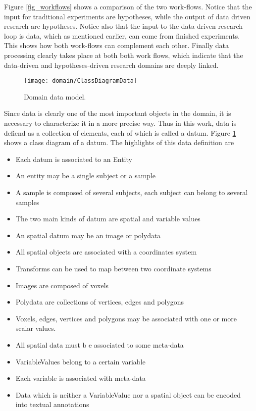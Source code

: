 Figure \ref{fig_workflows} shows a comparison of the two work-flows. Notice that the input for traditional experiments are hypotheses, while the output of data driven research are  hypotheses. Notice also that the input to the data-driven research loop is data, which as mentioned earlier, can come from finished experiments. This shows how both work-flows can complement each other. Finally data processing clearly takes place at both both work flows, which indicate that the data-driven and hypotheses-driven research domains are deeply linked.  

\begin{figure}
\centering
\texttt{[image: domain/ClassDiagramData]}
\caption{\label{fig_datum_class} Domain data model.}
\end{figure}

Since data is clearly one of the most important objects in the domain, it is necessary to characterize it in a more precise way. Thus in this work, data is defiend as a collection of elements, each of which is called a datum. Figure \ref{fig_datum_class} shows a class diagram of a datum. The highlights of this data definition are


\begin{itemize}
\item Each datum is associated to an Entity
\item An entity may be a single subject or a sample
\item A sample is composed of several subjects, each subject can belong to several samples
\item The two main kinds of datum are spatial and variable values
\item An spatial datum may be an image or polydata
\item All spatial objects are associated with a coordinates system
\item Transforms can be used to map between two coordinate systems
\item Images are composed of voxels
\item Polydata are collections of vertices, edges and polygons
\item Voxels, edges, vertices and polygons may be associated with one or more scalar values.
\item All spatial data must b	e associated to some meta-data
\item VariableValues belong to a certain variable
\item Each variable is associated with meta-data  
\item Data which is neither a VariableValue nor a spatial object can be encoded into textual annotations
\end{itemize} 

